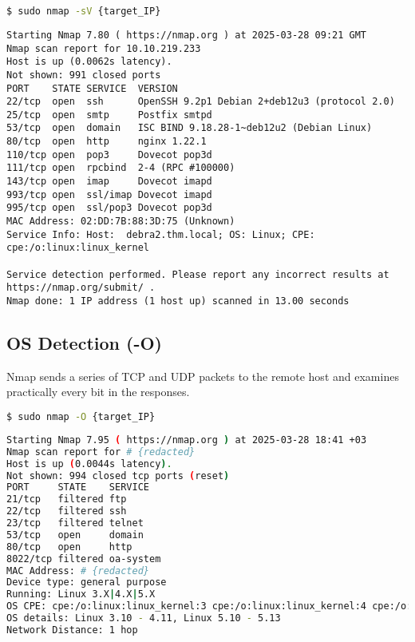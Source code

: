 \documentclass[11pt,a4paper]{article}
\newenvironment{commandbox}[1][]{
  \begin{tcolorbox}[
      colback=kalibackground,
      colframe=commandcolor,
      fonttitle=\bfseries\color{white},
      title=#1,
      breakable=true
    ]
  }{
  \end{tcolorbox}
}
\begin{document}
\clearpage

\begin{commandbox}[Service Version Detection for Comparison]
\begin{lstlisting}[language=bash, basicstyle=\small\ttfamily\color{warningcolor}]
$ sudo nmap -sV {target_IP}
\end{lstlisting}

\begin{lstlisting}[basicstyle=\small\ttfamily\color{kalitext}]
Starting Nmap 7.80 ( https://nmap.org ) at 2025-03-28 09:21 GMT
Nmap scan report for 10.10.219.233
Host is up (0.0062s latency).
Not shown: 991 closed ports
PORT    STATE SERVICE  VERSION
22/tcp  open  ssh      OpenSSH 9.2p1 Debian 2+deb12u3 (protocol 2.0)
25/tcp  open  smtp     Postfix smtpd
53/tcp  open  domain   ISC BIND 9.18.28-1~deb12u2 (Debian Linux)
80/tcp  open  http     nginx 1.22.1
110/tcp open  pop3     Dovecot pop3d
111/tcp open  rpcbind  2-4 (RPC #100000)
143/tcp open  imap     Dovecot imapd
993/tcp open  ssl/imap Dovecot imapd
995/tcp open  ssl/pop3 Dovecot pop3d
MAC Address: 02:DD:7B:88:3D:75 (Unknown)
Service Info: Host:  debra2.thm.local; OS: Linux; CPE: cpe:/o:linux:linux_kernel

Service detection performed. Please report any incorrect results at https://nmap.org/submit/ .
Nmap done: 1 IP address (1 host up) scanned in 13.00 seconds
\end{lstlisting}
\end{commandbox}


\subsection{OS Detection (-O)}

Nmap sends a series of TCP and UDP packets to the remote host and
examines practically every bit in the responses.

\begin{commandbox}[OS Detection Scan]
\begin{lstlisting}[language=bash, style=bash, basicstyle=\small\ttfamily\color{warningcolor}]
$ sudo nmap -O {target_IP}
\end{lstlisting}

\begin{lstlisting}[basicstyle=\small\ttfamily\color{kalitext}, language=bash, style=bash]
Starting Nmap 7.95 ( https://nmap.org ) at 2025-03-28 18:41 +03
Nmap scan report for # {redacted}
Host is up (0.0044s latency).
Not shown: 994 closed tcp ports (reset)
PORT     STATE    SERVICE
21/tcp   filtered ftp
22/tcp   filtered ssh
23/tcp   filtered telnet
53/tcp   open     domain
80/tcp   open     http
8022/tcp filtered oa-system
MAC Address: # {redacted}
Device type: general purpose
Running: Linux 3.X|4.X|5.X
OS CPE: cpe:/o:linux:linux_kernel:3 cpe:/o:linux:linux_kernel:4 cpe:/o:linux:linux_kernel:5
OS details: Linux 3.10 - 4.11, Linux 5.10 - 5.13
Network Distance: 1 hop
\end{lstlisting}
\end{commandbox}
\clearpage
\end{document}
